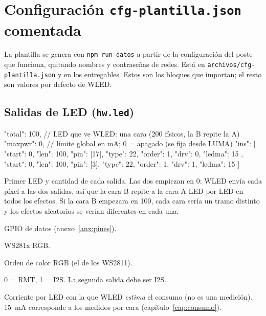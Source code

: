 \chapter{Configuración \texttt{cfg-plantilla.json} comentada}\label{anx:cfg}

La plantilla se genera con \texttt{npm run datos} a partir de la configuración del poste que funciona, quitando nombres y contraseñas de redes. Está en \texttt{archivos/cfg-plantilla.json} y en los entregables. Estos son los bloques que importan; el resto son valores por defecto de WLED.

\section{Salidas de LED (\texttt{hw.led})}
\begin{codigo}
"total": 100,       // LED que ve WLED: una cara (200 físicos, la B repite la A)
"maxpwr": 0,        // límite global en mA; 0 = apagado (se fija desde LUMA)
"ins": [
  { "start": 0, "len": 100, "pin": [17], "type": 22, "order": 1, "drv": 0, "ledma": 15 },
  { "start": 0, "len": 100, "pin": [3],  "type": 22, "order": 1, "drv": 1, "ledma": 15 }
]
\end{codigo}
\begin{description}[leftmargin=1.5em]
\item[\texttt{start}, \texttt{len}] Primer LED y cantidad de cada salida. Las dos empiezan en 0: WLED envía cada píxel a las dos salidas, así que la cara B repite a la cara A LED por LED en todos los efectos. Si la cara B empezara en 100, cada cara sería un tramo distinto y los efectos aleatorios se verían diferentes en cada una.
\item[\texttt{pin}] GPIO de datos (anexo~\ref{anx:pines}).
\item[\texttt{type: 22}] WS281x RGB.
\item[\texttt{order: 1}] Orden de color RGB (el de los WS2811).
\item[\texttt{drv}] 0 = RMT, 1 = I2S. La segunda salida debe ser I2S.
\item[\texttt{ledma: 15}] Corriente por LED con la que WLED \emph{estima} el consumo (no es una medición). 15~mA corresponde a los  medidos por cara (capítulo~\ref{cap:consumo}).
\end{description}

